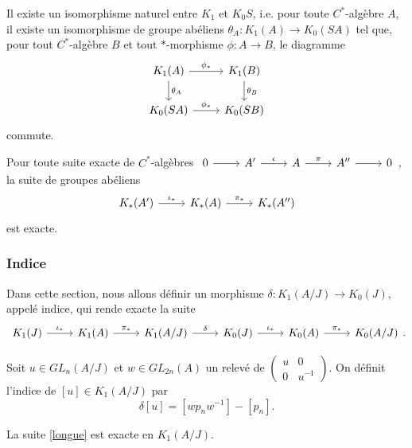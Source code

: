 \begin{thm}
Il existe un isomorphisme naturel  entre $K_1$ et $K_0 S$, i.e. pour toute $C^*$-algèbre $A$, il existe un isomorphisme de groupe abéliens $\theta_A : K_1(A) \rightarrow K_0(SA)$ tel que, pour tout $C^*$-algèbre $B$ et tout $*$-morphisme $\phi : A\rightarrow B$, le diagramme 
\[\begin{tikzcd}K_1(A) \arrow{r}{\phi_*}\arrow{d}{\theta_A} & K_1(B) \arrow{d}{\theta_B} \\ K_0(SA)\arrow{r}{\phi_*} & K_0(SB)\end{tikzcd}\]
commute.
\end{thm}

\begin{thm}
Pour toute suite exacte de $C^*$-algèbres $\begin{tikzcd}0\arrow{r} & A' \arrow{r}{\iota} & A\arrow{r}{\pi} & A''\arrow{r} & 0\end{tikzcd}$, la suite de groupes abéliens
\[\begin{tikzcd} K_*(A') \arrow{r}{\iota_*} & K_*(A)\arrow{r}{\pi_*} & K_*(A'')\end{tikzcd}\] est exacte.
\end{thm}

\subsubsection{Indice}
Dans cette section, nous allons définir un morphisme $\delta : K_1(A/J)\rightarrow K_0(J)$, appelé indice, qui rende exacte la suite
\begin{equation}\begin{tikzcd} K_1(J) \arrow{r}{\iota_*} & K_1(A)\arrow{r}{\pi_*} & K_1(A/J)\arrow{r}{\delta} 
& K_0(J) \arrow{r}{\iota_*} & K_0(A)\arrow{r}{\pi_*} & K_0(A/J)
\end{tikzcd}.\label{longue}\end{equation}
\begin{definition}
Soit $u\in GL_n(A/J)$ et $w\in GL_{2n}(A)$ un relevé de $\begin{pmatrix}u & 0 \\ 0 & u^{-1}\end{pmatrix}$. On définit l'indice de $[u]\in K_1(A/J)$ par \[\delta [u]=[wp_n w^{-1}]-[p_n].\]
\end{definition}

\begin{prop}
La suite \ref{longue} est exacte en $K_1(A/J)$.
\end{prop}

